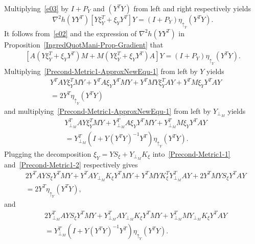 \documentclass[11pt]{article}
\newcommand{\whcomm}[2]{{\sf\color{purple} #1}{\sf\color{blue} #2}}
\numberwithin{equation}{section}
\begin{document}
Multiplying~\eqref{e03} by $I+P_Y$ and $(Y^TY)$ from left and right respectively yields 
\begin{equation} \label{e02}
  \nabla^2h(YY^T)[Y\xi_{Y}^T+\xi_{Y}Y^T]Y=(I+P_Y)\eta_{\uparrow_Y}(Y^TY).
\end{equation}
It follows from~\eqref{e02} and the expression of $\nabla^2 h(Y Y^T)$ in Proposition~\ref{IngredQuotMani-Prop-Gradient} that
\begin{align} \label{Precond-Metric1-ApproxNewEqu-1}
  [A(Y\xi_{Y}^T+\xi_{Y}Y^T)M+M(Y\xi_{Y}^T+\xi_{Y}Y^T)A]Y=(I+P_Y)\eta_{\uparrow_Y}(Y^TY).
\end{align}
Multiplying~\eqref{Precond-Metric1-ApproxNewEqu-1} from left by $Y$ yields
\begin{equation}
\begin{aligned} \label{Precond-Metric1-1}
  &Y^TAY\xi_{Y}^TMY +Y^TA\xi_{Y}Y^TMY+Y^TMY\xi_{Y}^TAY+Y^TM\xi_{Y}Y^TAY\\ 
  &= 2Y^T\eta_{\uparrow_Y}(Y^TY) 
\end{aligned}
\end{equation}
and multiplying~\eqref{Precond-Metric1-ApproxNewEqu-1} from left by $Y_{\perp_M}$ yields
\begin{equation}
  \begin{aligned} \label{Precond-Metric1-2}
    & Y_{\perp_M}^TAY\xi_{Y}^TMY+Y_{\perp_M}^TA\xi_{Y}Y^TMY+Y_{\perp_M}^T  M\xi_{Y}Y^TAY\\
    & =Y_{\perp_M}^T(I+Y(Y^TY)^{-1}Y^T)\eta_{\uparrow_Y}(Y^TY) .
  \end{aligned}
\end{equation}
Plugging the decomposition $\xi_{Y}=YS_\xi+Y_{\perp_M}K_\xi$ into~\eqref{Precond-Metric1-1} and~\eqref{Precond-Metric1-2} respectively gives
\begin{equation}
  \begin{aligned} \label{Precond-Metric1-12}
    & 2Y^TAYS_\xi Y^TMY+Y^TAY_{\perp_M} K_\xi Y^TMY+Y^TMYK_\xi^TY_{\perp_M}^TAY + 2Y^TMYS_\xi Y^TAY \\ 
    & = 2Y^T\eta_{\uparrow_Y}(Y^TY), 
  \end{aligned}
\end{equation}
and
\begin{equation}
  \begin{aligned} \label{Precond-Metric1-22}
    & 2Y_{\perp_M}^TAYS_\xi Y^TMY+Y_{\perp_M}^TAY_{\perp_M} K_\xi Y^TMY +Y_{\perp_M}^T MY_{\perp_M} K_\xi Y^TAY \\ 
    & = Y_{\perp_M}^T(I+Y(Y^TY)^{-1}Y^T)\eta_{\uparrow_Y}(Y^TY).
  \end{aligned}
\end{equation}
\end{document}
